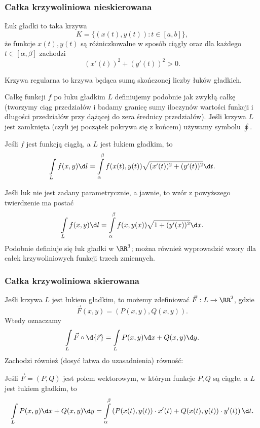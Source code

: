 \subsubsection{Całka krzywoliniowa nieskierowana}
\begin{definition}
    Łuk gładki to taka krzywa
    \[ K = \{(x(t), y(t)) : t \in [a, b]\}, \]
    że funkcje $x(t), y(t)$ są różniczkowalne w sposób ciągły oraz dla każdego $t \in [\alpha, \beta]$ zachodzi
    \[ (x'(t))^2 + (y'(t))^2 > 0. \]
\end{definition}

\begin{definition}
    Krzywa regularna to krzywa będąca sumą skończonej liczby łuków gładkich.
\end{definition}

Całkę funkcji $f$ po łuku gładkim $L$ definiujemy podobnie jak zwykłą całkę (tworzymy ciąg przedziałów i badamy granicę sumy iloczynów wartości funkcji i długości przedziałów przy dążącej do zera średnicy przedziałów). Jeśli krzywa $L$ jest zamknięta (czyli jej początek pokrywa się z końcem) używamy symbolu $\oint$.

\begin{theorem}
    Jeśli $f$ jest funkcją ciągłą, a $L$ jest łukiem gładkim, to
    \[ \int\limits_L f(x, y) \d l = \int\limits_\alpha^\beta f(x(t), y(t))\sqrt{(x'(t))^2 + (y'(t))^2} \d t. \]
\end{theorem}

Jeśli łuk nie jest zadany parametrycznie, a jawnie, to wzór z powyższego twierdzenie ma postać
\[ \int\limits_L f(x, y) \d l = \int\limits_\alpha^\beta f(x, y(x))\sqrt{1 + (y'(x))^2} \d x. \]
Podobnie definiuje się łuk gładki w $\RR^3$; można również wyprowadzić wzory dla całek krzywoliniowych funkcji trzech zmiennych.

\subsubsection{Całka krzywoliniowa skierowana}
Jeśli krzywa $L$ jest łukiem gładkim, to możemy zdefiniować  $\vec{F} : L \to \RR^2$, gdzie
\[ \vec{F}(x, y) = (P(x, y), Q(x, y)). \]
Wtedy  oznaczamy
\[ \int\limits_L \vec{F} \circ \d{\vec{r}} = \int\limits_L P(x, y) \d x + Q(x, y) \d y. \]
Zachodzi również (dosyć łatwa do uzasadnienia) równość:

\begin{theorem}
    \label{t:line integral}
    Jeśli $\vec{F} = (P, Q)$ jest polem wektorowym, w którym funkcje $P, Q$  są ciągłe, a $L$ jest łukiem gładkim, to
    \[ \int\limits_L P(x, y) \d x + Q(x, y) \d y = \int\limits_\alpha^\beta \left(P(x(t), y(t))\cdot x'(t) + Q(x(t), y(t))\cdot y'(t)\right) \d t. \]
\end{theorem}

